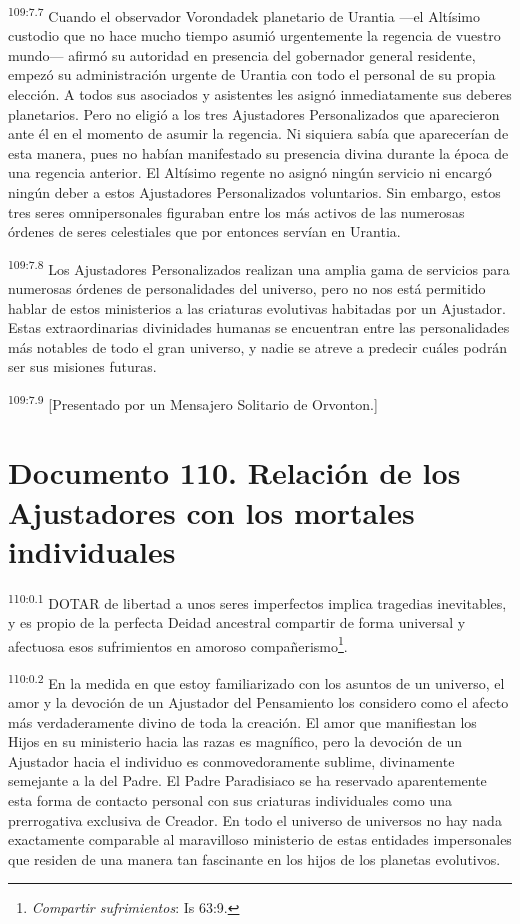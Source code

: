 \documentclass[twoside, 11pt]{book}
\begin{document}
\par
\textsuperscript{109:7.7} Cuando el observador Vorondadek planetario de Urantia ---el Altísimo custodio que no hace mucho tiempo asumió urgentemente la regencia de vuestro mundo--- afirmó su autoridad en presencia del gobernador general residente, empezó su administración urgente de Urantia con todo el personal de su propia elección. A todos sus asociados y asistentes les asignó inmediatamente sus deberes planetarios. Pero no eligió a los tres Ajustadores Personalizados que aparecieron ante él en el momento de asumir la regencia. Ni siquiera sabía que aparecerían de esta manera, pues no habían manifestado su presencia divina durante la época de una regencia anterior. El Altísimo regente no asignó ningún servicio ni encargó ningún deber a estos Ajustadores Personalizados voluntarios. Sin embargo, estos tres seres omnipersonales figuraban entre los más activos de las numerosas órdenes de seres celestiales que por entonces servían en Urantia.

\par
\textsuperscript{109:7.8} Los Ajustadores Personalizados realizan una amplia gama de servicios para numerosas órdenes de personalidades del universo, pero no nos está permitido hablar de estos ministerios a las criaturas evolutivas habitadas por un Ajustador. Estas extraordinarias divinidades humanas se encuentran entre las personalidades más notables de todo el gran universo, y nadie se atreve a predecir cuáles podrán ser sus misiones futuras.

\par
\textsuperscript{109:7.9} [Presentado por un Mensajero Solitario de Orvonton.]


\chapter{Documento 110. Relación de los Ajustadores con los mortales individuales}
\par
\textsuperscript{110:0.1} DOTAR de libertad a unos seres imperfectos implica tragedias inevitables, y es propio de la perfecta Deidad ancestral compartir de forma universal y afectuosa esos sufrimientos en amoroso compañerismo\footnote{\textit{Compartir sufrimientos}: Is 63:9.}.

\par
\textsuperscript{110:0.2} En la medida en que estoy familiarizado con los asuntos de un universo, el amor y la devoción de un Ajustador del Pensamiento los considero como el afecto más verdaderamente divino de toda la creación. El amor que manifiestan los Hijos en su ministerio hacia las razas es magnífico, pero la devoción de un Ajustador hacia el individuo es conmovedoramente sublime, divinamente semejante a la del Padre. El Padre Paradisiaco se ha reservado aparentemente esta forma de contacto personal con sus criaturas individuales como una prerrogativa exclusiva de Creador. En todo el universo de universos no hay nada exactamente comparable al maravilloso ministerio de estas entidades impersonales que residen de una manera tan fascinante en los hijos de los planetas evolutivos.
\end{document}
